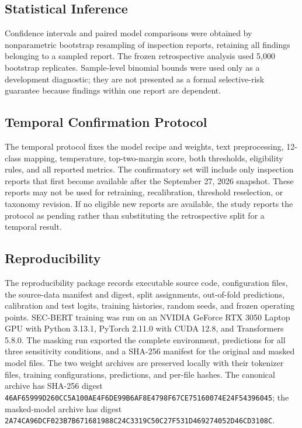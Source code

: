 \documentclass[11pt]{article}
\begin{document}
\subsection{Statistical Inference}

Confidence intervals and paired model comparisons were obtained by nonparametric
bootstrap resampling of inspection reports, retaining all findings belonging to a
sampled report. The frozen retrospective analysis used 5,000 bootstrap replicates.
Sample-level binomial bounds were used only as a development diagnostic; they are
not presented as a formal selective-risk guarantee because findings within one
report are dependent.

\subsection{Temporal Confirmation Protocol}

The temporal protocol fixes the model recipe and weights, text preprocessing,
12-class mapping, temperature, top-two-margin score, both thresholds, eligibility
rules, and all reported metrics. The confirmatory set will include only inspection
reports that first become available after the September 27, 2026 snapshot. These
reports may not be used for retraining, recalibration, threshold reselection, or
taxonomy revision. If no eligible new reports are available, the study reports the
protocol as pending rather than substituting the retrospective split for a temporal
result.

\subsection{Reproducibility}

The reproducibility package records executable source code, configuration files,
the source-data manifest and digest, split assignments, out-of-fold predictions,
calibration and test logits, training histories, random seeds, and frozen operating
points. SEC-BERT training was run on an NVIDIA GeForce RTX 3050 Laptop GPU with
Python 3.13.1, PyTorch 2.11.0 with CUDA 12.8, and Transformers 5.8.0. The masking run exported
the complete environment, predictions for all three sensitivity conditions, and
a SHA-256 manifest for the original and masked model files. The two weight
archives are preserved locally with their tokenizer files, training configurations,
predictions, and per-file hashes. The canonical archive has SHA-256 digest
\texttt{46AF65999D260CC5A100AE4F6DE99B6AF8E4798F67CE75160074E24F54396045};
the masked-model archive has digest
\texttt{2A74CA96DCF023B7B671681988C24C3319C50C27F531D469274052D46CD3108C}.
\end{document}
